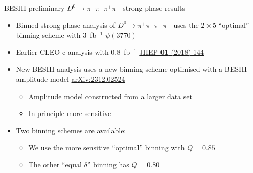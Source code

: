 \documentclass[xcolor={dvipsnames}]{beamer}
\begin{document}
\begin{frame}{BESIII preliminary $D^0\to\pi^+\pi^-\pi^+\pi^-$ strong-phase results}
  \vspace{0.3cm}
  \begin{itemize}
    \setlength\itemsep{1.0em}
    \item{Binned strong-phase analysis of $D^0\to\pi^+\pi^-\pi^+\pi^-$ uses the $2\times5$ ``optimal'' binning scheme with $3$~fb$^{-1}$ $\psi(3770)$}
    \item{Earlier CLEO-c analysis with $0.8$~fb$^{-1}$ \href{https://link.springer.com/article/10.1007/JHEP01(2018)144}{JHEP \textbf{01} (2018) 144}}
    \item{New BESIII analysis uses a new binning scheme optimised with a BESIII amplitude model \href{https://arxiv.org/abs/2312.02524}{arXiv:2312.02524}}
    \begin{itemize}
      \item{Amplitude model constructed from a larger data set}
      \item{In principle more sensitive}
    \end{itemize}
    \item{Two binning schemes are available:}
    \begin{itemize}
      \item{We use the more sensitive ``optimal'' binning with $Q = 0.85$}
      \item{The other ``equal $\delta$'' binning has $Q = 0.80$}
    \end{itemize}
  \end{itemize}
\end{frame}
\end{document}
